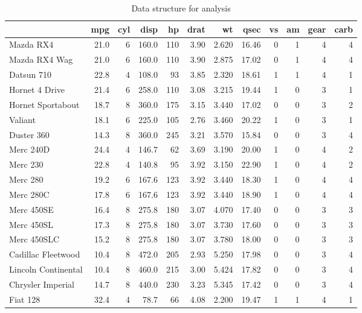 \documentclass[
  11pt,
  american,
  letterpaper,
  ]{article}
\begin{document}
\begin{table}

\caption{\label{tab:xtable-example}Data structure for analysis}
\centering
\begin{tabular}[t]{l|r|r|r|r|r|r|r|r|r|r|r}
\hline
  & mpg & cyl & disp & hp & drat & wt & qsec & vs & am & gear & carb\\
\hline
Mazda RX4 & 21.0 & 6 & 160.0 & 110 & 3.90 & 2.620 & 16.46 & 0 & 1 & 4 & 4\\
\hline
Mazda RX4 Wag & 21.0 & 6 & 160.0 & 110 & 3.90 & 2.875 & 17.02 & 0 & 1 & 4 & 4\\
\hline
Datsun 710 & 22.8 & 4 & 108.0 & 93 & 3.85 & 2.320 & 18.61 & 1 & 1 & 4 & 1\\
\hline
Hornet 4 Drive & 21.4 & 6 & 258.0 & 110 & 3.08 & 3.215 & 19.44 & 1 & 0 & 3 & 1\\
\hline
Hornet Sportabout & 18.7 & 8 & 360.0 & 175 & 3.15 & 3.440 & 17.02 & 0 & 0 & 3 & 2\\
\hline
Valiant & 18.1 & 6 & 225.0 & 105 & 2.76 & 3.460 & 20.22 & 1 & 0 & 3 & 1\\
\hline
Duster 360 & 14.3 & 8 & 360.0 & 245 & 3.21 & 3.570 & 15.84 & 0 & 0 & 3 & 4\\
\hline
Merc 240D & 24.4 & 4 & 146.7 & 62 & 3.69 & 3.190 & 20.00 & 1 & 0 & 4 & 2\\
\hline
Merc 230 & 22.8 & 4 & 140.8 & 95 & 3.92 & 3.150 & 22.90 & 1 & 0 & 4 & 2\\
\hline
Merc 280 & 19.2 & 6 & 167.6 & 123 & 3.92 & 3.440 & 18.30 & 1 & 0 & 4 & 4\\
\hline
Merc 280C & 17.8 & 6 & 167.6 & 123 & 3.92 & 3.440 & 18.90 & 1 & 0 & 4 & 4\\
\hline
Merc 450SE & 16.4 & 8 & 275.8 & 180 & 3.07 & 4.070 & 17.40 & 0 & 0 & 3 & 3\\
\hline
Merc 450SL & 17.3 & 8 & 275.8 & 180 & 3.07 & 3.730 & 17.60 & 0 & 0 & 3 & 3\\
\hline
Merc 450SLC & 15.2 & 8 & 275.8 & 180 & 3.07 & 3.780 & 18.00 & 0 & 0 & 3 & 3\\
\hline
Cadillac Fleetwood & 10.4 & 8 & 472.0 & 205 & 2.93 & 5.250 & 17.98 & 0 & 0 & 3 & 4\\
\hline
Lincoln Continental & 10.4 & 8 & 460.0 & 215 & 3.00 & 5.424 & 17.82 & 0 & 0 & 3 & 4\\
\hline
Chrysler Imperial & 14.7 & 8 & 440.0 & 230 & 3.23 & 5.345 & 17.42 & 0 & 0 & 3 & 4\\
\hline
Fiat 128 & 32.4 & 4 & 78.7 & 66 & 4.08 & 2.200 & 19.47 & 1 & 1 & 4 & 1\\

\end{tabular}
\end{table}
\end{document}
